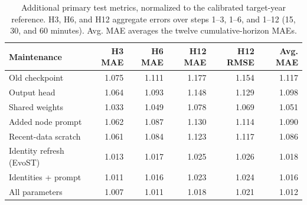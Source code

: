 \begin{table}[t]
\centering
\caption{Additional primary test metrics, normalized to the calibrated target-year reference. H3, H6, and H12 aggregate errors over steps 1--3, 1--6, and 1--12 (15, 30, and 60 minutes). Avg. MAE averages the twelve cumulative-horizon MAEs.}
\label{tab:horizons}
\begin{tabular}{lrrrrr}
\toprule
Maintenance & H3 MAE & H6 MAE & H12 MAE & H12 RMSE & Avg. MAE \\
\midrule
Old checkpoint & 1.075 & 1.111 & 1.177 & 1.154 & 1.117 \\
Output head & 1.064 & 1.093 & 1.148 & 1.129 & 1.098 \\
Shared weights & 1.033 & 1.049 & 1.078 & 1.069 & 1.051 \\
Added node prompt & 1.062 & 1.087 & 1.130 & 1.114 & 1.090 \\
Recent-data scratch & 1.061 & 1.084 & 1.123 & 1.117 & 1.086 \\
Identity refresh (EvoST) & 1.013 & 1.017 & 1.025 & 1.026 & 1.018 \\
Identities + prompt & 1.011 & 1.016 & 1.023 & 1.024 & 1.016 \\
All parameters & 1.007 & 1.011 & 1.018 & 1.021 & 1.012 \\
\bottomrule
\end{tabular}
\end{table}
